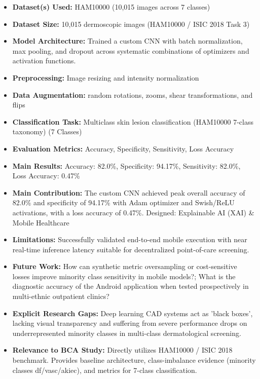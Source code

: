 \documentclass[11pt,a4paper]{article}
\begin{document}
\begin{itemize}\small
\item \textbf{Dataset(s) Used:} HAM10000 (10,015 images across 7 classes)
\item \textbf{Dataset Size:} 10,015 dermoscopic images (HAM10000 / ISIC 2018 Task 3)
\item \textbf{Model Architecture:} Trained a custom CNN with batch normalization, max pooling, and dropout across systematic combinations of optimizers and activation functions.
\item \textbf{Preprocessing:} Image resizing and intensity normalization
\item \textbf{Data Augmentation:} random rotations, zooms, shear transformations, and flips
\item \textbf{Classification Task:} Multiclass skin lesion classification (HAM10000 7-class taxonomy) (7 Classes)
\item \textbf{Evaluation Metrics:} Accuracy, Specificity, Sensitivity, Loss Accuracy
\item \textbf{Main Results:} Accuracy: 82.0\%, Specificity: 94.17\%, Sensitivity: 82.0\%, Loss Accuracy: 0.47\%
\item \textbf{Main Contribution:} The custom CNN achieved peak overall accuracy of 82.0\% and specificity of 94.17\% with Adam optimizer and Swish/ReLU activations, with a loss accuracy of 0.47\%. Designed: Explainable AI (XAI) \& Mobile Healthcare
\item \textbf{Limitations:} Successfully validated end-to-end mobile execution with near real-time inference latency suitable for decentralized point-of-care screening.
\item \textbf{Future Work:} How can synthetic metric oversampling or cost-sensitive losses improve minority class sensitivity in mobile models?; What is the diagnostic accuracy of the Android application when tested prospectively in multi-ethnic outpatient clinics?
\item \textbf{Explicit Research Gaps:} Deep learning CAD systems act as 'black boxes', lacking visual transparency and suffering from severe performance drops on underrepresented minority classes in multi-class dermatological screening.
\item \textbf{Relevance to BCA Study:} Directly utilizes HAM10000 / ISIC 2018 benchmark. Provides baseline architecture, class-imbalance evidence (minority classes df/vasc/akiec), and metrics for 7-class classification.
\end{itemize}
\end{document}
